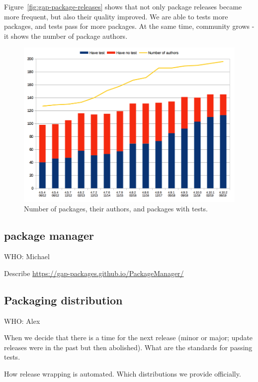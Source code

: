 \documentclass{deliverablereport}
\begin{document}
Figure~\ref{fig:gap-package-releases} shows that not only
package releases became more frequent, but also their quality
improved. We are able to tests more packages, and tests pass
for more packages. At the same time, community grows - it
shows the number of package authors.

\begin{figure}[!ht]
    \centering
    \includegraphics[width=\textwidth]{images/gap-package-tests}
    \caption{Number of \GAP packages, their authors, and packages with tests.}
    \label{fig:gap-package-tests}
\end{figure}

\subsection{\GAP package manager}\label{pkg-manager}

WHO: Michael

Describe \url{https://gap-packages.github.io/PackageManager/}

\subsection{Packaging \GAP distribution}\label{distro}

WHO: Alex

When we decide that there is a time for the next release
(minor or major; update releases were in the past but then abolished).
What are the standards for passing tests. 

How release wrapping is automated.
Which \GAP distributions we provide officially.
\end{document}
